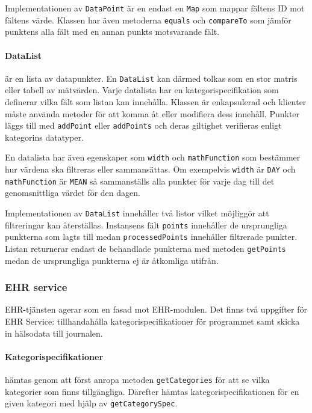 \documentclass[techdoc/techdoc.tex]{subfiles}
\begin{document}
Implementationen av \texttt{DataPoint} är en endast en \texttt{Map} som mappar
fältens ID mot fältens värde. Klassen har även metoderna \texttt{equals} och
\texttt{compareTo} som jämför punktens alla fält med en annan punkts
motsvarande fält.

\paragraph{DataList} är en lista av datapunkter. En \texttt{DataList} kan
därmed tolkas som en stor matris eller tabell av mätvärden. Varje datalista har
en kategorispecifikation som definerar vilka fält som listan kan innehålla.
Klassen är enkapsulerad och klienter måste använda metoder för att komma åt
eller modifiera dess innehåll. Punkter läggs till med \texttt{addPoint} eller
\texttt{addPoints} och deras giltighet verifieras enligt kategorins datatyper.

En datalista har även egenskaper som \texttt{width} och \texttt{mathFunction}
som bestämmer hur värdena ska filtreras eller sammansättas. Om exempelvis
\texttt{width} är \texttt{DAY} och \texttt{mathFunction} är \texttt{MEAN} så
sammanställs alla punkter för varje dag till det genomsnittliga värdet för den
dagen.

Implementationen av \texttt{DataList} innehåller två listor vilket möjliggör
att filtreringar kan återställas. Instansens fält \texttt{points} innehåller de
ursprungliga punkterna som lagts till medan \texttt{processedPoints} innehåller
filtrerade punkter. Listan returnerar endast de behandlade punkterna med
metoden \texttt{getPoints} medan de ursprungliga punkterna ej är åtkomliga
utifrån.


\subsubsection{EHR service}
EHR-tjänsten agerar som en fasad mot EHR-modulen. Det finns två uppgifter för
EHR Service: tillhandahålla kategorispecifikationer för programmet samt skicka
in hälsodata till journalen.

\paragraph{Kategorispecifikationer} hämtas genom att först anropa metoden
\texttt{getCategories} för att se vilka kategorier som finns tillgängliga.
Därefter hämtas kategorispecifikationen för en given kategori med hjälp av
\texttt{getCategorySpec}.
\end{document}

